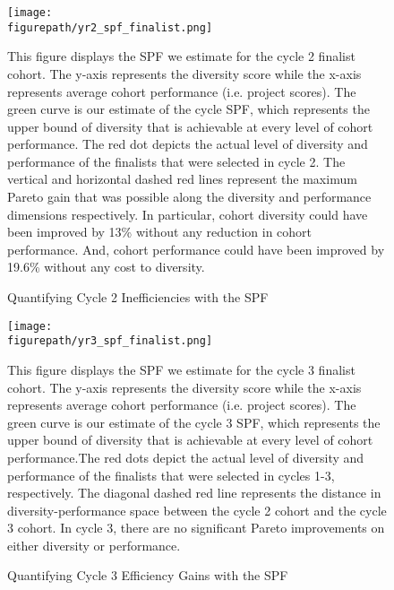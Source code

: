     \newpage
    \begin{figure}[!htb]
    \centering
        \caption{Quantifying Cycle 2 Inefficiencies with the SPF} \label{fig:spf_2022}
      \texttt{[image: \\figurepath/yr2\_spf\_finalist.png]} 
        \begin{notes}
        This figure displays the SPF we estimate for the cycle 2 finalist cohort. The y-axis represents the diversity score while the x-axis represents average cohort performance (i.e. project scores). The green curve is our estimate of the cycle SPF, which represents the upper bound of diversity that is achievable at every level of cohort performance. The red dot depicts the actual level of diversity and performance of the finalists that were selected in cycle 2. The vertical and horizontal dashed red lines represent the maximum Pareto gain that was possible along the diversity and performance dimensions respectively. In particular, cohort diversity could have been improved by 13\% without any reduction in cohort performance. And, cohort performance could have been improved by 19.6\% without any cost to diversity. 
        \end{notes}
    \end{figure}
    
    \newpage
    \begin{figure}[!htb]
    \centering
        \caption{Quantifying Cycle 3 Efficiency Gains with the SPF} \label{fig:spf_2023}
      \texttt{[image: \\figurepath/yr3\_spf\_finalist.png]} 
        \begin{notes}
        This figure displays the SPF we estimate for the cycle 3 finalist cohort. The y-axis represents the diversity score while the x-axis represents average cohort performance (i.e. project scores). The green curve is our estimate of the cycle 3 SPF, which represents the upper bound of diversity that is achievable at every level of cohort performance.The red dots depict the actual level of diversity and performance of the finalists that were selected in cycles 1-3, respectively. The diagonal dashed red line represents the distance in diversity-performance space between the cycle 2 cohort and the cycle 3 cohort. In cycle 3, there are no significant Pareto improvements on either diversity or performance. 
        \end{notes}
    \end{figure}
    
